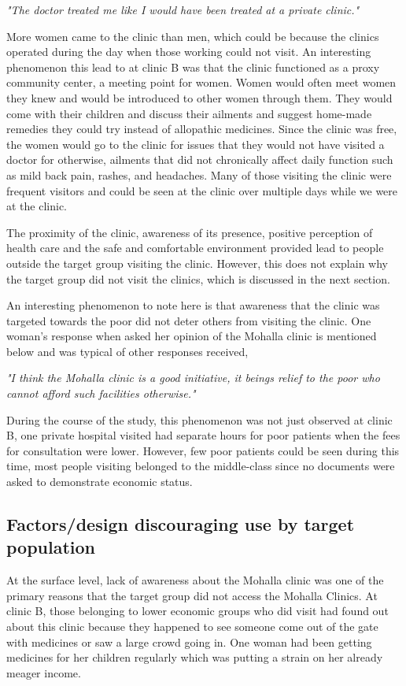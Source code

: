 \textit{"The doctor treated me like I would have been treated at a private clinic."}

More women came to the clinic than men, which could be because the clinics operated during the day when those working could not visit. An interesting phenomenon this lead to at clinic B was that the clinic functioned as a proxy community center, a meeting point for women. Women would often meet women they knew and would be introduced to other women through them. They would come with their children and discuss their ailments and suggest home-made remedies they could try instead of allopathic medicines. Since the clinic was free, the women would go to the clinic for issues that they would not have visited a doctor for otherwise, ailments that did not chronically affect daily function such as mild back pain, rashes, and headaches. Many of those visiting the clinic were frequent visitors and could be seen at the clinic over multiple days while we were at the clinic. 

The proximity of the clinic, awareness of its presence, positive perception of health care and the safe and comfortable environment provided lead to people outside the target group visiting the clinic. However, this does not explain why the target group did not visit the clinics, which is discussed in the next section. 

An interesting phenomenon to note here is that awareness that the clinic was targeted towards the poor did not deter others from visiting the clinic. One woman's response when asked her opinion of the Mohalla clinic is mentioned below and was typical of other responses received, 

\textit{"I think the Mohalla clinic is a good initiative, it beings relief to the poor who cannot afford such facilities otherwise."}

During the course of the study, this phenomenon was not just observed at clinic B, one private hospital visited had separate hours for poor patients when the fees for consultation were lower. However, few poor patients could be seen during this time, most people visiting belonged to the middle-class since no documents were asked to demonstrate economic status.

\subsection{Factors/design discouraging use by target population} %
At the surface level, lack of awareness about the Mohalla clinic was one of the primary reasons that the target group did not access the Mohalla Clinics. At clinic B, those belonging to lower economic groups who did visit had found out about this clinic because they happened to see someone come out of the gate with medicines or saw a large crowd going in. One woman had been getting medicines for her children regularly which was putting a strain on her already meager income. 

